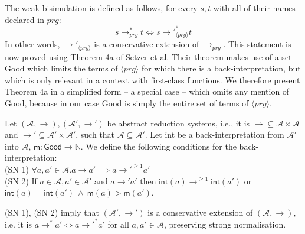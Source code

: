 The weak bisimulation is defined as follows, for every $s,t$ with all of their names declared in $prg$:
\begin{equation}
\label{eq:bisim1}
s \longrightarrow_{prg}^* t \iff s {\longrightarrow'}_{\langle prg \rangle}^* t
\end{equation}
In other words, $\longrightarrow'_{\langle prg \rangle}$ is a conservative extension of $\longrightarrow_{prg}$. This statement is now proved using Theorem 4a of Setzer et al.\cite{setzer14unnesting} Their theorem makes use of a set \textsf{Good} which limits the terms of $\langle prg \rangle$ for which there is a back-interpretation, but which is only relevant in a context with first-class functions. We therefore present Theorem 4a in a simplified form -- a special case -- which omits any mention of \textsf{Good}, because in our case \textsf{Good} is simply the entire set of terms of $\langle prg \rangle$.

\begin{theorem}[Setzer et al.]
\label{thm:setzer4a}
Let $(\mathcal{A}, \longrightarrow), (\mathcal{A}', \longrightarrow')$ be abstract reduction systems, i.e., it is $\longrightarrow \subseteq \mathcal{A} \times \mathcal{A}$ and $\longrightarrow' \subseteq \mathcal{A}' \times \mathcal{A}'$, such that $\mathcal{A} \subseteq \mathcal{A}'$. Let \textsf{int} be a back-interpretation from $\mathcal{A}'$ into $\mathcal{A}$, $\textsf{m} : \textsf{Good} \to \mathbb{N}$. We define the following conditions for the back-interpretation:\\
(SN 1) $\forall a, a' \in \mathcal{A}. a \longrightarrow a' \implies a {\longrightarrow'}^{\geq 1} a'$\\
(SN 2) If $a \in \mathcal{A}, a' \in \mathcal{A}'$ and $a \longrightarrow' a'$ then $\textsf{int}(a) {\longrightarrow}^{\geq 1} \textsf{int}(a')$ or $\textsf{int}(a) = \textsf{int}(a') ~ \land ~ \textsf{m}(a) > \textsf{m}(a')$.

(SN 1), (SN 2) imply that $(\mathcal{A}', \longrightarrow')$ is a conservative extension of $(\mathcal{A}, \longrightarrow)$, i.e. it is $a \longrightarrow^* a' \iff a {\longrightarrow'}^* a'$ for all $a, a' \in \mathcal{A}$, preserving strong normalisation.
\end{theorem}


